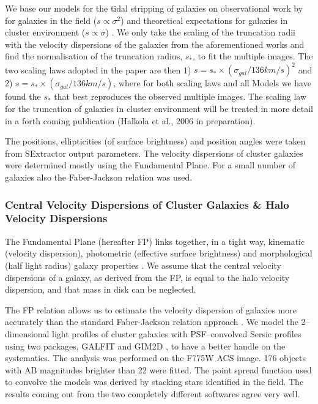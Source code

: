 \documentclass[useAMS,usenatbib]{mn2e}
\newcounter{one}   \setcounter{one}{1}
\newcounter{two}   \setcounter{two}{2}
\begin{document}
We base our models for the tidal stripping of galaxies on
observational work by \citet{hoekstra:04} for galaxies in the field
($s \propto \sigma^2$) and theoretical expectations for galaxies in
cluster environment ($s \propto \sigma$) \citep{merritt:83}. We only
take the scaling of the truncation radii with the velocity dispersions
of the galaxies from the aforementioned works and find the
normalisation of the truncation radius, $s_*$, to fit the multiple
images. The two scaling laws adopted in the paper are then 1)
$s=s_*\times(\sigma_{gal}/136km/s)^2$ and 2)
$s=s_*\times(\sigma_{gal}/136km/s)$, where for both scaling laws and
all Models we have found the $s_*$ that best reproduces the observed
multiple images. The scaling law for the truncation of galaxies in
cluster environment will be treated in more detail in a forth coming
publication (Halkola et al., 2006 in preparation).

The positions, ellipticities (of surface brightness) and position
angles were taken from SExtractor output parameters. The velocity
dispersions of cluster galaxies were determined mostly using the
Fundamental Plane. For a small number of galaxies also the
Faber-Jackson relation was used.


\subsubsection{Central Velocity Dispersions of Cluster Galaxies \& Halo
Velocity Dispersions}

The Fundamental Plane (hereafter FP) links together, in a tight way,
kinematic (velocity dispersion), photometric (effective surface
brightness) and morphological (half light radius) galaxy properties
\citep{dressler:87,djorgovski:87,bender:92}. We assume that the
central velocity dispersions of a galaxy, as derived from the FP, is
equal to the halo velocity dispersion, and that mass in disk can be
neglected.

The FP relation allows us to estimate the velocity dispersion of
galaxies more accurately than the standard Faber-Jackson relation
approach \citep{faber:76}. We model the 2--dimensional light profiles
of cluster galaxies with PSF--convolved Sersic \citep{sersic:68}
profiles using two packages, GALFIT \citep{peng:02} and GIM2D
\citep{simard:99}, to have a better handle on the systematics. The
analysis was performed on the F775W ACS image. 176 objects with AB
magnitudes brighter than 22 were fitted. The point spread function
used to convolve the models was derived by stacking stars identified
in the field. The results coming out from the two completely different
softwares agree very well.
\end{document}
